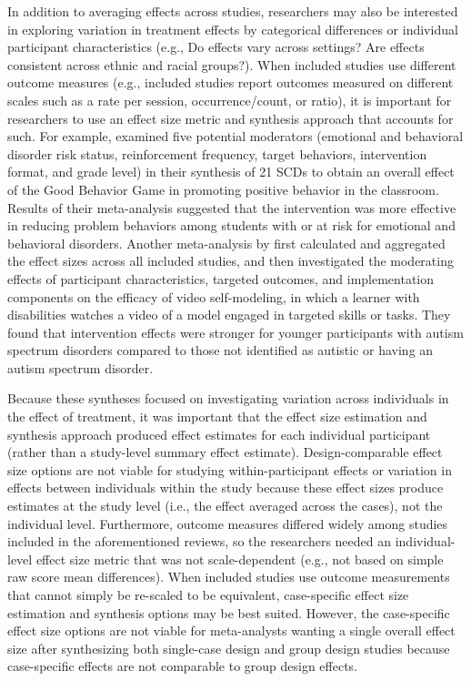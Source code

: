 \documentclass[
]{book}
\begin{document}
In addition to averaging effects across studies, researchers may also be interested in exploring variation in treatment effects by categorical differences or individual participant characteristics (e.g., Do effects vary across settings? Are effects consistent across ethnic and racial groups?).
When included studies use different outcome measures (e.g., included studies report outcomes measured on different scales such as a rate per session, occurrence/count, or ratio), it is important for researchers to use an effect size metric and synthesis approach that accounts for such.
For example, \citet{bowman-perrott2016Promoting} examined five potential moderators (emotional and behavioral disorder risk status, reinforcement frequency, target behaviors, intervention format, and grade level) in their synthesis of 21 SCDs to obtain an overall effect of the Good Behavior Game in promoting positive behavior in the classroom.
Results of their meta-analysis suggested that the intervention was more effective in reducing problem behaviors among students with or at risk for emotional and behavioral disorders.
Another meta-analysis by \citet{Mason_Davis_Ayres_Davis_Mason_2016} first calculated and aggregated the effect sizes across all included studies, and then investigated the moderating effects of participant characteristics, targeted outcomes, and implementation components on the efficacy of video self-modeling, in which a learner with disabilities watches a video of a model engaged in targeted skills or tasks.
They found that intervention effects were stronger for younger participants with autism spectrum disorders compared to those not identified as autistic or having an autism spectrum disorder.

Because these syntheses focused on investigating variation across individuals in the effect of treatment, it was important that the effect size estimation and synthesis approach produced effect estimates for each individual participant (rather than a study-level summary effect estimate).
Design-comparable effect size options are not viable for studying within-participant effects or variation in effects between individuals within the study because these effect sizes produce estimates at the study level (i.e., the effect averaged across the cases), not the individual level.
Furthermore, outcome measures differed widely among studies included in the aforementioned reviews, so the researchers needed an individual-level effect size metric that was not scale-dependent (e.g., not based on simple raw score mean differences).
When included studies use outcome measurements that cannot simply be re-scaled to be equivalent, case-specific effect size estimation and synthesis options may be best suited.
However, the case-specific effect size options are not viable for meta-analysts wanting a single overall effect size after synthesizing both single-case design and group design studies because case-specific effects are not comparable to group design effects.
\end{document}

